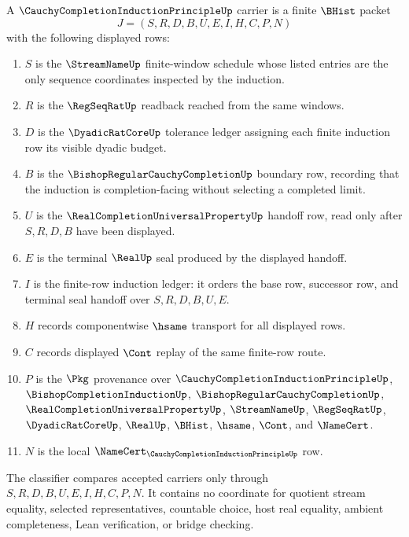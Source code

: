 \begin{definition}
\label{def:cauchy-completion-induction-principle-carrier}
A $\CauchyCompletionInductionPrincipleUp$ carrier is a finite $\BHist$ packet
$$
J=(S,R,D,B,U,E,I,H,C,P,N)
$$
with the following displayed rows:
\begin{enumerate}
\item $S$ is the $\StreamNameUp$ finite-window schedule whose listed entries are the only sequence coordinates inspected by the induction.
\item $R$ is the $\RegSeqRatUp$ readback reached from the same windows.
\item $D$ is the $\DyadicRatCoreUp$ tolerance ledger assigning each finite induction row its visible dyadic budget.
\item $B$ is the $\BishopRegularCauchyCompletionUp$ boundary row, recording that the induction is completion-facing without selecting a completed limit.
\item $U$ is the $\RealCompletionUniversalPropertyUp$ handoff row, read only after $S,R,D,B$ have been displayed.
\item $E$ is the terminal $\RealUp$ seal produced by the displayed handoff.
\item $I$ is the finite-row induction ledger: it orders the base row, successor row, and terminal seal handoff over $S,R,D,B,U,E$.
\item $H$ records componentwise $\hsame$ transport for all displayed rows.
\item $C$ records displayed $\Cont$ replay of the same finite-row route.
\item $P$ is the $\Pkg$ provenance over $\CauchyCompletionInductionPrincipleUp$, $\BishopCompletionInductionUp$, $\BishopRegularCauchyCompletionUp$, $\RealCompletionUniversalPropertyUp$, $\StreamNameUp$, $\RegSeqRatUp$, $\DyadicRatCoreUp$, $\RealUp$, $\BHist$, $\hsame$, $\Cont$, and $\NameCert$.
\item $N$ is the local $\NameCert_{\CauchyCompletionInductionPrincipleUp}$ row.
\end{enumerate}
The classifier compares accepted carriers only through $S,R,D,B,U,E,I,H,C,P,N$. It contains no coordinate for quotient stream equality, selected representatives, countable choice, host real equality, ambient completeness, Lean verification, or bridge checking.
\end{definition}

